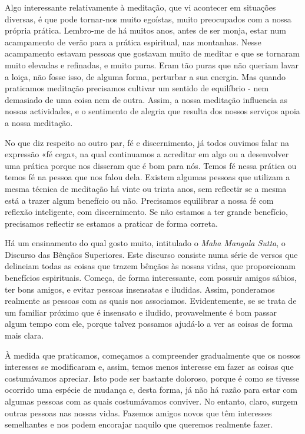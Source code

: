 Algo interessante relativamente à meditação, que vi acontecer em
situações diversas, é que pode tornar-nos muito egoístas, muito
preocupados com a nossa própria prática. Lembro-me de há muitos anos,
antes de ser monja, estar num acampamento de verão para a prática
espiritual, nas montanhas. Nesse acampamento estavam pessoas que
gostavam muito de meditar e que se tornaram muito elevadas e refinadas,
e muito puras. Eram tão puras que não queriam lavar a loiça, não fosse
isso, de alguma forma, perturbar a sua energia. Mas quando praticamos
meditação precisamos cultivar um sentido de equilíbrio - nem demasiado
de uma coisa nem de outra. Assim, a nossa meditação influencia as nossas
actividades, e o sentimento de alegria que resulta dos nossos serviços
apoia a nossa meditação.

No que diz respeito ao outro par, fé e discernimento, já todos ouvimos
falar na expressão «fé cega», na qual continuamos a acreditar em algo ou
a desenvolver uma prática porque nos disseram que é bom para nós. Temos
fé nessa prática ou temos fé na pessoa que nos falou dela. Existem
algumas pessoas que utilizam a mesma técnica de meditação há vinte ou
trinta anos, sem reflectir se a mesma está a trazer algum benefício ou
não. Precisamos equilibrar a nossa fé com reflexão inteligente, com
discernimento. Se não estamos a ter grande benefício, precisamos
reflectir se estamos a praticar de forma correta.

Há um ensinamento do qual gosto muito, intitulado o \emph{Maha Mangala
Sutta}, o Discurso das Bênçãos Superiores. Este discurso consiste numa
série de versos que delineiam todas as coisas que trazem bênçãos às
nossas vidas, que proporcionam benefícios espirituais. Começa, de forma
interessante, com possuir amigos sábios, ter bons amigos, e evitar
pessoas insensatas e iludidas. Assim, ponderamos realmente as pessoas
com as quais nos associamos. Evidentemente, se se trata de um familiar
próximo que é insensato e iludido, provavelmente é bom passar algum
tempo com ele, porque talvez possamos ajudá-lo a ver as coisas de forma
mais clara.

À medida que praticamos, começamos a compreender gradualmente que os
nossos interesses se modificaram e, assim, temos menos interesse em
fazer as coisas que costumávamos apreciar. Isto pode ser bastante
doloroso, porque é como se tivesse ocorrido uma espécie de mudança e,
desta forma, já não há razão para estar com algumas pessoas com as quais
costumávamos conviver. No entanto, claro, surgem outras pessoas nas
nossas vidas. Fazemos amigos novos que têm interesses semelhantes e nos
podem encorajar naquilo que queremos realmente fazer.

